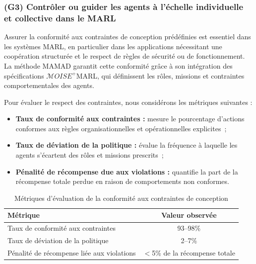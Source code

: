 \subsubsection{(G3) Contrôler ou guider les agents à l'échelle individuelle et collective dans le MARL}

Assurer la conformité aux contraintes de conception prédéfinies est essentiel dans les systèmes MARL, en particulier dans les applications nécessitant une coopération structurée et le respect de règles de sécurité ou de fonctionnement. La méthode MAMAD garantit cette conformité grâce à son intégration des spécifications $\mathcal{M}OISE^+$MARL, qui définissent les rôles, missions et contraintes comportementales des agents.

Pour évaluer le respect des contraintes, nous considérons les métriques suivantes :

\begin{itemize}
    \item \textbf{Taux de conformité aux contraintes :} mesure le pourcentage d'actions conformes aux règles organisationnelles et opérationnelles explicites~;
    \item \textbf{Taux de déviation de la politique :} évalue la fréquence à laquelle les agents s'écartent des rôles et missions prescrits~;
    \item \textbf{Pénalité de récompense due aux violations :} quantifie la part de la récompense totale perdue en raison de comportements non conformes.
\end{itemize}

\begin{table}[h!]
    \centering
    \caption{Métriques d'évaluation de la conformité aux contraintes de conception}
    \begin{tabular}{lc}
        \hline
        \textbf{Métrique}                          & \textbf{Valeur observée}       \\
        \hline
        Taux de conformité aux contraintes         & 93--98\%                       \\
        \hline
        Taux de déviation de la politique          & 2--7\%                         \\
        \hline
        Pénalité de récompense liée aux violations & $<$5\% de la récompense totale \\
        \hline
    \end{tabular}
    \label{tab:compliance_fr}
\end{table}

